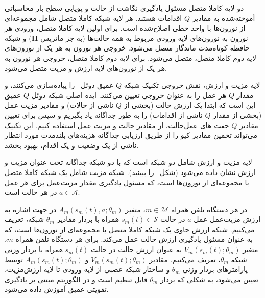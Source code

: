 




دو لایه کاملا متصل مسئول یادگیری نگاشت از حالت و پویایی سطح بار محاسباتی آموخته‌شده به مقادیر $Q$ اقدامات هستند. هر لایه شبکه کاملا متصل شامل مجموعه‌ای از نورون‌ها با واحد خطی اصلاح‌شده است. برای اولین لایه کاملا متصل، ورودی هر نورون به نورون‌های لایه ورودی مربوط به همه حالت‌ها (به جز ماتریس $\textbf{H}$) و شبکه حافظه کوتاه‌مدت ماندگار متصل می‌شود. خروجی هر نورون به هر یک از نورون‌های لایه دوم کاملا متصل، متصل می‌شود. برای لایه دوم کاملا متصل، خروجی هر نورون به هر یک از نورون‌های لایه ارزش و مزیت متصل می‌شود.



لایه مزیت و ارزش، نقش خروجی تکنیک شبکه $Q$ عمیق دوئل~\cite{wang2016dueling} را پیاده‌سازی می‌کنند، و مقدار $Q$ هر عمل را به عنوان خروجی تعیین می‌کنند. ایده اصلی شبکه دوئل $Q$ عمیق این است که ابتدا یک ارزش حالت (بخشی از  $Q$ ناشی از حالات) و مقادیر مزیت عمل (بخشی از مقدار $Q$ ناشی از اقدامات) را به طور جداگانه یاد بگیریم و سپس برای تعیین مقادیر $Q$ جفت های عمل‌حالت، از مقادیر حالت و مزیت عمل استفاده کنیم. این تکنیک می‌تواند تخمین مقادیر کیو را از طریق ارزیابی جداگانه هزینه‌های بلندمدت مورد انتظار ناشی از یک وضعیت و یک اقدام، بهبود بخشد. 

لایه مزیت و ارزش شامل دو شبکه است که با دو شبکه جداگانه تحت عنوان مزیت و ارزش نشان داده می‌شود (شکل~ را ببینید). شبکه مزیت شامل یک شبکه کاملا متصل با مجموعه‌ای از نورون‌ها است، که مسئول یادگیری مقدار مزیت‌عمل برای هر عمل $a \in \mathcal{A}$ در هر حالت است.






%



در هر دستگاه تلفن همراه $m \in \mathcal{M}$، متغیر $A_m(s_m(t), a;\theta_m)$ در جهت اشاره به ارزش مزیت‌عمل عمل $a$ در حالت  $s_m(t) \in \mathcal{S}$ همراه با بردار مقادیر $\theta_m$ شبکه، تعریف می‌کنیم. شبکه ارزش حاوی یک شبکه کاملا متصل با مجموعه‌ای از نورون‌ها است، که به عنوان مسئول یادگیری ارزش حالت عمل می‌کند. برای هر دستگاه تلفن همراه $m$، متغیر $V_m(s_m(t);\theta_m)$ به عنوان ارزش حالت در حالت $s_m(t)$ همراه با بردار وزنی شبکه $\theta_m$، تعریف می‌کنیم. مقادیر $V_m(s_m(t);\theta_m)$ و $A_m(s_m(t);\theta_m)$ توسط پارامترهای بردار وزنی $\theta_m$ و ساختار شبکه عصبی از لایه ورودی تا لایه ارزش‌مزیت، تعیین می‌شود، به شکلی که بردار $\theta_m$ قابل تنظیم است و در الگوریتم مبتنی بر یادگیری تقویتی عمیق آموزش داده می‌شود.

